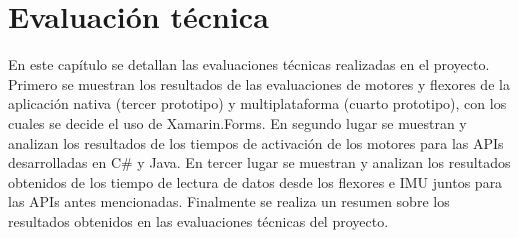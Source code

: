 \newpage
\chapter{Evaluación técnica}
En este capítulo se detallan las evaluaciones técnicas realizadas en el proyecto. Primero se muestran los resultados de las evaluaciones de motores y flexores de la aplicación nativa (tercer prototipo) y multiplataforma (cuarto prototipo), con los cuales se decide el uso de Xamarin.Forms. En segundo lugar se muestran y analizan los resultados de los tiempos de activación de los motores para las APIs desarrolladas en C\# y Java. En tercer lugar se muestran y analizan los resultados obtenidos de los tiempo de lectura de datos desde los flexores e IMU juntos para las APIs antes mencionadas. Finalmente se realiza un resumen sobre los resultados obtenidos en las evaluaciones técnicas del proyecto.